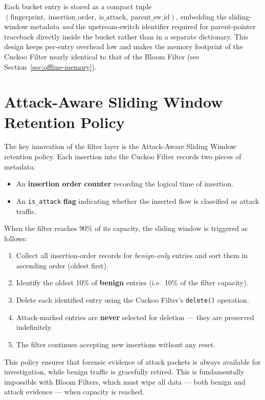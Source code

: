\documentclass[12pt, a4paper]{report}
\begin{document}
Each bucket entry is stored as a compact tuple
$(\text{fingerprint},\ \text{insertion\_order},\ \text{is\_attack},\
\text{parent\_sw\_id})$, embedding the sliding-window metadata
\textit{and} the upstream-switch identifier required for parent-pointer
traceback directly inside the bucket rather than in a separate
dictionary. This design keeps per-entry overhead low and makes the memory
footprint of the Cuckoo Filter nearly identical to that of the Bloom
Filter (see Section~\ref{sec:offline-memory}).

\section{Attack-Aware Sliding Window Retention Policy}

The key innovation of the filter layer is the Attack-Aware Sliding Window
retention policy. Each insertion into the Cuckoo Filter records two pieces
of metadata:

\begin{itemize}[leftmargin=*]
  \item An \textbf{insertion order counter} recording the logical time
  of insertion.
  \item An \texttt{is\_attack} \textbf{flag} indicating whether the
  inserted flow is classified as attack traffic.
\end{itemize}

When the filter reaches 90\% of its capacity, the sliding window is
triggered as follows:

\begin{enumerate}[leftmargin=*, label=\textbf{Step \arabic*:}]
  \item Collect all insertion-order records for \textit{benign-only}
  entries and sort them in ascending order (oldest first).
  \item Identify the oldest 10\% of \textbf{benign} entries (i.e.\ 10\%
  of the filter capacity).
  \item Delete each identified entry using the Cuckoo Filter's
  \texttt{delete()} operation.
  \item Attack-marked entries are \textbf{never} selected for deletion
  --- they are preserved indefinitely.
  \item The filter continues accepting new insertions without any reset.
\end{enumerate}

This policy ensures that forensic evidence of attack packets is always
available for investigation, while benign traffic is gracefully retired.
This is fundamentally impossible with Bloom Filters, which must wipe all
data --- both benign and attack evidence --- when capacity is reached.
\end{document}
